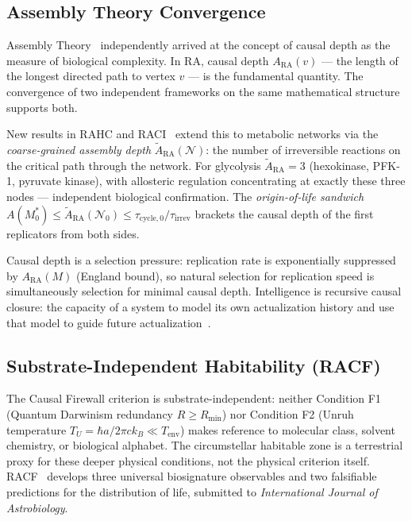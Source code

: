 \documentclass[11pt,a4paper]{article}
\begin{document}
\subsection{Assembly Theory Convergence}

Assembly Theory~\citep{Walker2023} independently arrived at
the concept of causal depth as the measure of biological complexity.
In RA, causal depth $A_{\mathrm{RA}}(v)$ --- the length of the longest
directed path to vertex $v$ --- is the fundamental quantity. The
convergence of two independent frameworks on the same mathematical
structure supports both.


New results in RAHC and RACI~\citep{Sandeman2026RAHC,Sandeman2026RACI}
extend this to metabolic networks via the \emph{coarse-grained assembly
depth} $\tilde{A}_{\mathrm{RA}}(\mathcal{N})$: the number of irreversible
reactions on the critical path through the network. For glycolysis
$\tilde{A}_{\mathrm{RA}} = 3$ (hexokinase, PFK-1, pyruvate kinase),
with allosteric regulation concentrating at exactly these three nodes ---
independent biological confirmation. The \emph{origin-of-life sandwich}
$A(M^*_0) \leq \tilde{A}_{\mathrm{RA}}(\mathcal{N}_0) \leq
\tau_{\mathrm{cycle},0}/\tau_{\mathrm{irrev}}$
brackets the causal depth of the first replicators from both sides.


Causal depth is a selection pressure: replication rate is exponentially
suppressed by $A_{\mathrm{RA}}(M)$ (England bound), so natural selection
for replication speed is simultaneously selection for minimal causal depth.
Intelligence is recursive causal closure: the capacity of a system to
model its own actualization history and use that model to guide future
actualization~\citep{Sandeman2026RAHC}.

\subsection{Substrate-Independent Habitability (RACF)}


The Causal Firewall criterion is substrate-independent: neither Condition
F1 (Quantum Darwinism redundancy $R \geq R_{\min}$) nor Condition F2
(Unruh temperature $T_U = \hbar a/2\pi c k_B \ll T_{\mathrm{env}}$) makes
reference to molecular class, solvent chemistry, or biological alphabet.
The circumstellar habitable zone is a terrestrial proxy for these deeper
physical conditions, not the physical criterion itself.
RACF~\citep{Sandeman2026RACF} develops three universal biosignature
observables and two falsifiable predictions for the distribution of life,
submitted to \emph{International Journal of Astrobiology}.
\end{document}
